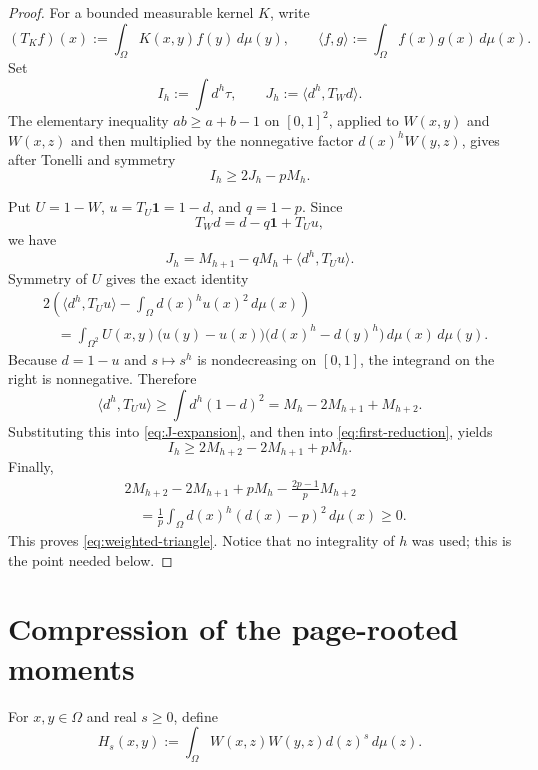 \documentclass[11pt]{article}
\newcommand{\dd}{\,d}
\begin{document}
\begin{proof}
For a bounded measurable kernel $K$, write
\[
 (T_Kf)(x):=\int_\Omega K(x,y)f(y)\dd\mu(y),
 \qquad
 \langle f,g\rangle:=\int_\Omega f(x)g(x)\dd\mu(x).
\]
Set
\[
 I_h:=\int d^h\tau,
 \qquad
 J_h:=\langle d^h,T_Wd\rangle.
\]
The elementary inequality $ab\geq a+b-1$ on $[0,1]^2$, applied to
$W(x,y)$ and $W(x,z)$ and then multiplied by the nonnegative factor
$d(x)^hW(y,z)$, gives after Tonelli and symmetry
\begin{equation}
 I_h\geq2J_h-pM_h.
 \label{eq:first-reduction}
\end{equation}

Put $U=1-W$, $u=T_U\mathbf1=1-d$, and $q=1-p$.  Since
\[
 T_Wd=d-q\mathbf1+T_Uu,
\]
we have
\begin{equation}
 J_h=M_{h+1}-qM_h+\langle d^h,T_Uu\rangle.
 \label{eq:J-expansion}
\end{equation}
Symmetry of $U$ gives the exact identity
\begin{align*}
 &2\left(\langle d^h,T_Uu\rangle
       -\int_\Omega d(x)^hu(x)^2\dd\mu(x)\right)
 \\
 &\quad=
 \int_{\Omega^2}U(x,y)
 \bigl(u(y)-u(x)\bigr)
 \bigl(d(x)^h-d(y)^h\bigr)
 \dd\mu(x)\dd\mu(y).
\end{align*}
Because $d=1-u$ and $s\mapsto s^h$ is nondecreasing on $[0,1]$,
the integrand on the right is nonnegative.  Therefore
\[
 \langle d^h,T_Uu\rangle
 \geq\int d^h(1-d)^2
 =M_h-2M_{h+1}+M_{h+2}.
\]
Substituting this into \eqref{eq:J-expansion}, and then into
\eqref{eq:first-reduction}, yields
\[
 I_h\geq2M_{h+2}-2M_{h+1}+pM_h.
\]
Finally,
\begin{align*}
 &2M_{h+2}-2M_{h+1}+pM_h
 -\frac{2p-1}{p}M_{h+2}
 \\
 &\quad=
 \frac1p\int_\Omega d(x)^h(d(x)-p)^2\dd\mu(x)
 \geq0.
\end{align*}
This proves \eqref{eq:weighted-triangle}.  Notice that no integrality
of $h$ was used; this is the point needed below.
\end{proof}


\section{Compression of the page-rooted moments}

For $x,y\in\Omega$ and real $s\geq0$, define
\[
 H_s(x,y):=
 \int_\Omega W(x,z)W(y,z)d(z)^s\dd\mu(z).
\]
\end{document}
